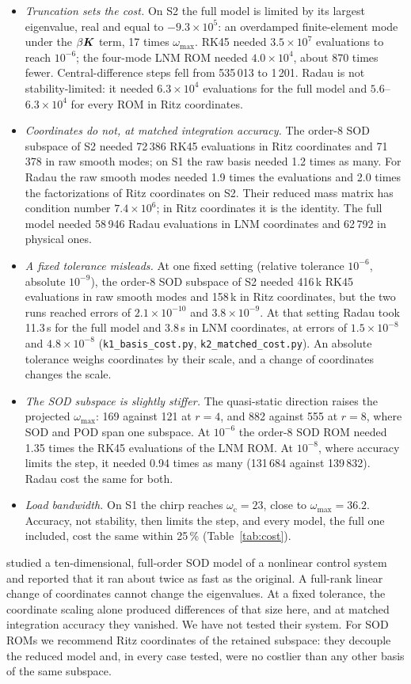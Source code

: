 \documentclass[11pt]{article}
\begin{document}
\begin{itemize}
\item \emph{Truncation sets the cost.} On S2 the full model is limited by its largest eigenvalue, real and equal to $-9.3\times10^5$: an overdamped finite-element mode under the $\beta\bm{K}$ term, 17 times $\omega_{\max}$. RK45 needed $3.5\times10^7$ evaluations to reach $10^{-6}$; the four-mode LNM ROM needed $4.0\times10^4$, about 870 times fewer. Central-difference steps fell from 535\,013 to 1\,201. Radau is not stability-limited: it needed $6.3\times10^4$ evaluations for the full model and $5.6$--$6.3\times10^4$ for every ROM in Ritz coordinates.
\item \emph{Coordinates do not, at matched integration accuracy.} The order-8 SOD subspace of S2 needed 72\,386 RK45 evaluations in Ritz coordinates and 71\,378 in raw smooth modes; on S1 the raw basis needed 1.2 times as many. For Radau the raw smooth modes needed 1.9 times the evaluations and 2.0 times the factorizations of Ritz coordinates on S2. Their reduced mass matrix has condition number $7.4\times10^6$; in Ritz coordinates it is the identity. The full model needed 58\,946 Radau evaluations in LNM coordinates and 62\,792 in physical ones.
\item \emph{A fixed tolerance misleads.} At one fixed setting (relative tolerance $10^{-6}$, absolute $10^{-9}$), the order-8 SOD subspace of S2 needed 416\,k RK45 evaluations in raw smooth modes and 158\,k in Ritz coordinates, but the two runs reached errors of $2.1\times10^{-10}$ and $3.8\times10^{-9}$. At that setting Radau took 11.3\,s for the full model and 3.8\,s in LNM coordinates, at errors of $1.5\times10^{-8}$ and $4.8\times10^{-8}$ (\texttt{k1\_basis\_cost.py}, \texttt{k2\_matched\_cost.py}). An absolute tolerance weighs coordinates by their scale, and a change of coordinates changes the scale.
\item \emph{The SOD subspace is slightly stiffer.} The quasi-static direction raises the projected $\omega_{\max}$: 169 against 121 at $r=4$, and 882 against 555 at $r=8$, where SOD and POD span one subspace. At $10^{-6}$ the order-8 SOD ROM needed 1.35 times the RK45 evaluations of the LNM ROM. At $10^{-8}$, where accuracy limits the step, it needed 0.94 times as many (131\,684 against 139\,832). Radau cost the same for both.
\item \emph{Load bandwidth.} On S1 the chirp reaches $\omega_{\mathrm c}=23$, close to $\omega_{\max}=36.2$. Accuracy, not stability, then limits the step, and every model, the full one included, cost the same within 25\,\% (Table~\ref{tab:cost}).
\end{itemize}
\citet{Ilbeigi2018} studied a ten-dimensional, full-order SOD model of a nonlinear control system and reported that it ran about twice as fast as the original. A full-rank linear change of coordinates cannot change the eigenvalues. At a fixed tolerance, the coordinate scaling alone produced differences of that size here, and at matched integration accuracy they vanished. We have not tested their system.
For SOD ROMs we recommend Ritz coordinates of the retained subspace: they decouple the reduced model and, in every case tested, were no costlier than any other basis of the same subspace.
\end{document}
